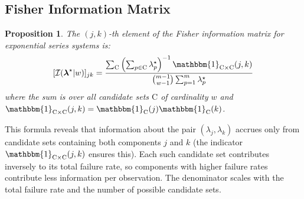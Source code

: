 \documentclass[12pt]{article}
\newcommand{\RV}[1]{\mathrm{#1}}
\newcommand{\cand}{\RV{C}}         %
\newcommand{\tparam}[1]{{#1}^{\star}}  %
\newcommand{\infomatrx}{\mathcal{I}}
\renewcommand{\vec}[1]{\boldsymbol{#1}}
\newcommand{\SetIndicator}[1]{\mathbbm{1}_{#1}}
\newtheorem{proposition}[theorem]{Proposition}
\theoremstyle{definition}
\theoremstyle{remark}
\begin{document}
\subsection{Fisher Information Matrix}

\begin{proposition}
\label{prop:expo_fisher}
The $(j,k)$-th element of the Fisher information matrix for exponential series systems is:
\begin{equation}
\label{eq:expo_fisher_element}
[\infomatrx(\tparam{\vec{\lambda}} | w)]_{jk} = \frac{\sum_{\cand} \left(\sum_{p \in \cand} \tparam{\lambda}_p\right)^{-1} \SetIndicator{\cand \times \cand}(j,k)}{\binom{m-1}{w-1} \sum_{p=1}^{m} \tparam{\lambda}_p}
\end{equation}
where the sum is over all candidate sets $\cand$ of cardinality $w$ and $\SetIndicator{\cand \times \cand}(j,k) = \SetIndicator{\cand}(j)\SetIndicator{\cand}(k)$.
\end{proposition}

This formula reveals that information about the pair $(\lambda_j, \lambda_k)$ accrues only from candidate sets containing both components $j$ and $k$ (the indicator $\SetIndicator{\cand \times \cand}(j,k)$ ensures this). Each such candidate set contributes inversely to its total failure rate, so components with higher failure rates contribute less information per observation. The denominator scales with the total failure rate and the number of possible candidate sets.
\end{document}
